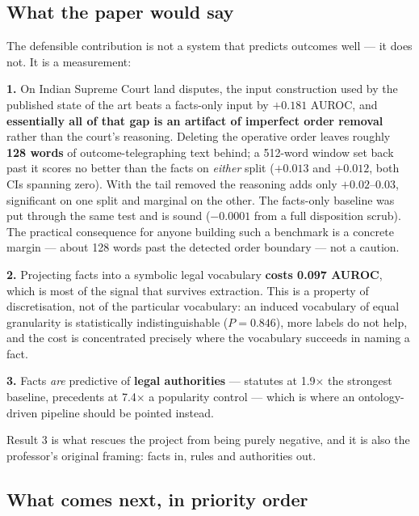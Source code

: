 \documentclass[12pt,a4paper]{article}
\begin{document}
\subsection{What the paper would say}

The defensible contribution is not a system that predicts outcomes well --- it does not. It is a
measurement:

\begin{tcolorbox}[plainbox,title={The contribution}]
\textbf{1.} On Indian Supreme Court land disputes, the input construction used by the published
state of the art beats a facts-only input by $+0.181$ AUROC, and \textbf{essentially all of that gap
is an artifact of imperfect order removal} rather than the court's reasoning. Deleting the operative
order leaves roughly \textbf{128 words} of outcome-telegraphing text behind; a 512-word window set
back past it scores no better than the facts on \emph{either} split ($+0.013$ and $+0.012$, both
CIs spanning zero). With the tail removed the reasoning adds only $+0.02$--$0.03$, significant on
one split and marginal on the other. The facts-only baseline was put through the same test and is
sound ($-0.0001$ from a full disposition scrub). The practical consequence for anyone building such
a benchmark is a concrete margin --- about 128 words past the detected order boundary --- not a
caution.

\smallskip
\textbf{2.} Projecting facts into a symbolic legal vocabulary \textbf{costs 0.097 AUROC}, which is
most of the signal that survives extraction. This is a property of discretisation, not of the
particular vocabulary: an induced vocabulary of equal granularity is statistically indistinguishable
($P=0.846$), more labels do not help, and the cost is concentrated precisely where the vocabulary
succeeds in naming a fact.

\smallskip
\textbf{3.} Facts \emph{are} predictive of \textbf{legal authorities} --- statutes at 1.9$\times$ the
strongest baseline, precedents at 7.4$\times$ a popularity control --- which is where an
ontology-driven pipeline should be pointed instead.
\end{tcolorbox}

Result 3 is what rescues the project from being purely negative, and it is also the professor's
original framing: facts in, rules and authorities out.

\subsection{What comes next, in priority order}
\end{document}
